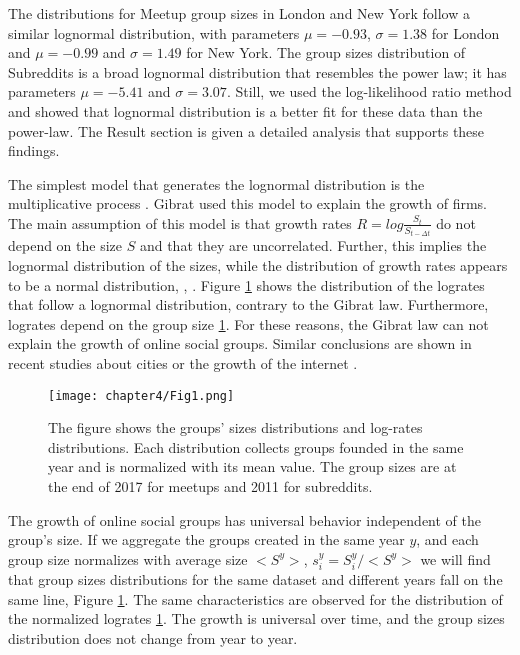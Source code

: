 The distributions for Meetup group sizes in London and New York follow a similar lognormal distribution, with parameters $\mu= -0.93$, $\sigma = 1.38$ for London and $\mu=-0.99$ and $\sigma=1.49$ for New York. The group sizes distribution of Subreddits is a broad lognormal distribution that resembles the power law; it has parameters $\mu= -5.41$ and $\sigma = 3.07$.   Still, we used the log-likelihood ratio method and showed that lognormal distribution is a better fit for these data than the power-law. The Result section is given a detailed analysis that supports these findings.   

The simplest model that generates the lognormal distribution is the multiplicative process \cite{mitzenmacher2004brief}. Gibrat used this model to explain the growth of firms. The main assumption of this model is that growth rates  $R = log\frac{S_t}{S_{t-\Delta t}}$ do not depend on the size $S$ and that they are uncorrelated. Further, this implies the lognormal distribution of the sizes, while the distribution of growth rates appears to be a normal distribution,  \cite{mondani2014fat}, \cite{fu2005growth}. Figure \ref{fig:scale} shows the distribution of the logrates that follow a lognormal distribution, contrary to the Gibrat law. Furthermore, logrates depend on the group size \ref{fig:scale}. For these reasons, the Gibrat law can not explain the growth of online social groups. Similar conclusions are shown in recent studies about cities or the growth of the internet \cite{frasco2014spatially, qian2014origin}.   

\begin{figure}[h]
	\centering
	\texttt{[image: chapter4/Fig1.png]}
	\caption[Universality in the Meetup and Reddit groups.]{The figure shows the groups' sizes distributions and log-rates distributions. Each distribution collects groups founded in the same year and is normalized with its mean value. The group sizes are at the end of 2017 for meetups and 2011 for subreddits.}
	\label{fig:scale}
\end{figure}

The growth of online social groups has universal behavior independent of the group's size. If we aggregate the groups created in the same year $y$, and each group size normalizes with average size $<S^y>$, $s^{y}_{i}=S^{y}_{i}/<S^{y}>$ we will find that group sizes distributions for the same dataset and different years fall on the same line, Figure \ref{fig:scale}. The same characteristics are observed for the distribution of the normalized logrates \ref{fig:scale}. The growth is universal over time, and the group sizes distribution does not change from year to year.

